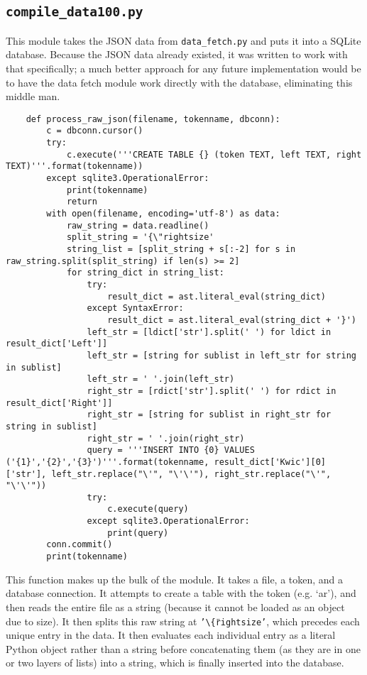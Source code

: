 \documentclass{article}      %
\begin{document}
	\subsection{\texttt{compile\_data100.py}}
	
	This module takes the JSON data from \texttt{data\_fetch.py} and puts it into a SQLite database. Because the JSON data already existed, it was written to work with that specifically; a much better approach for any future implementation would be to have the data fetch module work directly with the database, eliminating this middle man.
	
	\begin{verbatim}
	def process_raw_json(filename, tokenname, dbconn):
		c = dbconn.cursor()
		try:
			c.execute('''CREATE TABLE {} (token TEXT, left TEXT, right TEXT)'''.format(tokenname))
		except sqlite3.OperationalError:
			print(tokenname)
			return
		with open(filename, encoding='utf-8') as data:
			raw_string = data.readline()
			split_string = '{\"rightsize'
			string_list = [split_string + s[:-2] for s in raw_string.split(split_string) if len(s) >= 2]
			for string_dict in string_list:
				try:
					result_dict = ast.literal_eval(string_dict)
				except SyntaxError:
					result_dict = ast.literal_eval(string_dict + '}')
				left_str = [ldict['str'].split(' ') for ldict in result_dict['Left']]
				left_str = [string for sublist in left_str for string in sublist]
				left_str = ' '.join(left_str)
				right_str = [rdict['str'].split(' ') for rdict in result_dict['Right']]
				right_str = [string for sublist in right_str for string in sublist]
				right_str = ' '.join(right_str)
				query = '''INSERT INTO {0} VALUES ('{1}','{2}','{3}')'''.format(tokenname, result_dict['Kwic'][0]['str'], left_str.replace("\'", "\'\'"), right_str.replace("\'", "\'\'"))
				try:
					c.execute(query)
				except sqlite3.OperationalError:
					print(query)
		conn.commit()
		print(tokenname)
	\end{verbatim}
	
	This function makes up the bulk of the module. It takes a file, a token, and a database connection. It attempts to create a table with the token (e.g. `ar'), and then reads the entire file as a string (because it cannot be loaded as an object due to size). It then splits this raw string at \texttt{'\textbackslash\{\"rightsize'}, which precedes each unique entry in the data. It then evaluates each individual entry as a literal Python object rather than a string before concatenating them (as they are in one or two layers of lists) into a string, which is finally inserted into the database.
	
\end{document}
